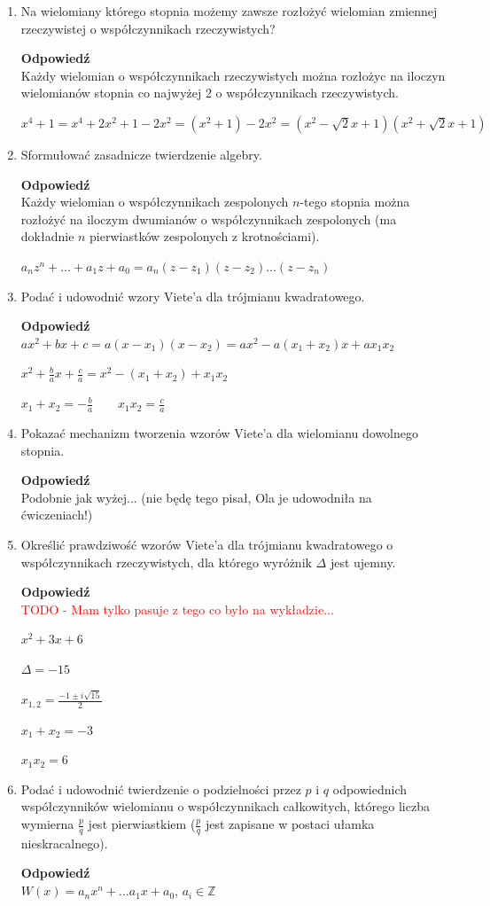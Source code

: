 \documentclass[12pt,a4paper]{article}
\newcounter{twierdzenie}
\theoremstyle{break}
\newcommand{\Odp}[1]{
		\begin{mdframed}[style=zadanie]
			\textbf{Odpowiedź}\\
			#1
		\end{mdframed}
	}
\begin{document}
\begin{enumerate}[1.]
	\item Na wielomiany którego stopnia możemy zawsze rozłożyć wielomian zmiennej rzeczywistej o współczynnikach rzeczywistych?
	\Odp{
		Każdy wielomian o współczynnikach rzeczywistych można rozłożyc na iloczyn wielomianów stopnia co najwyżej 2 o współczynnikach rzeczywistych.
		
		$x^4+1=x^4+2x^2+1-2x^2=(x^2+1)-2x^2 = (x^2-\sqrt{2}x+1)(x^2+\sqrt{2}x+1)$
	}
	
	\item Sformułować zasadnicze twierdzenie algebry.
	\Odp{
		Każdy wielomian o współczynnikach zespolonych $n$-tego stopnia można rozłożyć na iloczym dwumianów o współczynnikach zespolonych (ma dokładnie $n$ pierwiastków zespolonych z krotnościami).
		
		$a_nz^n+\dots+a_1z+a_0=a_n(z-z_1)(z-z_2)\dots(z-z_n)$
	}
	
	\item Podać i udowodnić wzory Viete’a dla trójmianu kwadratowego.
	\Odp{
		$ax^2+bx+c=a(x-x_1)(x-x_2)=ax^2 - a(x_1+x_2)x+ax_1x_2$
		
		$x^2+\frac{b}{a}x+\frac{c}{a}=x^2 - (x_1+x_2) + x_1x_2$
		
		$x_1+x_2 = -\frac{b}{a}\qquad x_1x_2=\frac{c}{a}$
	}
	
	\item Pokazać mechanizm tworzenia wzorów Viete’a dla wielomianu dowolnego stopnia.
	\Odp{
		Podobnie jak wyżej... (nie będę tego pisał, Ola je udowodniła na ćwiczeniach!)
	}
	
	\item Określić prawdziwość wzorów Viete’a dla trójmianu kwadratowego o współczynnikach rzeczywistych, dla którego wyróżnik $\Delta$ jest ujemny.
	\Odp{
		\textcolor{red}{TODO - Mam tylko pasuje z tego co było na wykładzie...}
		
		$x^2+3x+6$
		
		$\Delta=-15$
		
		$x_{1,2}=\frac{-1\pm i\sqrt{15}}{2}$
		
		$x_1+x_2 = -3$
		
		$x_1x_2=6$
	}

	\item Podać i udowodnić twierdzenie o podzielności przez $p$ i $q$ odpowiednich współczynników wielomianu o współczynnikach całkowitych, którego liczba wymierna $\frac{p}{q}$ jest pierwiastkiem ($\frac{p}{q}$ jest zapisane w postaci ułamka nieskracalnego).
	\Odp{
		$W(x)=a_nx^n+\dots a_1x+a_0$, $a_i\in\mathbb{Z}$
		
}
\end{enumerate}
\end{document}
